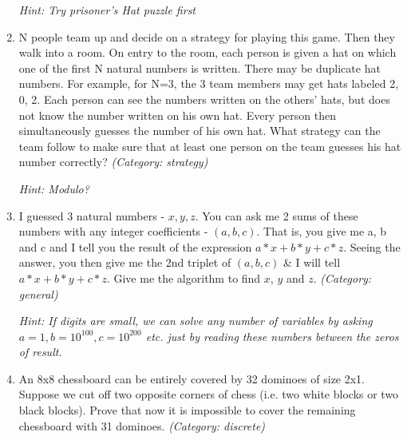 \begin{enumerate}
\small\emph{Hint: Try prisoner's Hat puzzle first}





\item N people team up and decide on a strategy for playing this game. Then they walk into a room.  On entry to the room, each person is given a hat on which one of the first N natural numbers is written. There may be duplicate hat numbers. For example, for N=3, the 3 team members may get hats labeled 2, 0, 2.  Each person can see the numbers written on the others' hats, but does not know the number written on his own hat. Every person then simultaneously guesses the number of his own hat.  What strategy can the team follow to make sure that at least one person on the team guesses his hat number correctly?
\small\emph{(Category: strategy)}

\small\emph{Hint: Modulo?}





\item I guessed 3 natural numbers - $x, y, z$. You can ask me 2 sums of these numbers with any integer coefficients - $(a, b, c)$. That is, you give me a, b and c and I tell you the result of the expression $a*x+b*y+c*z$. Seeing the answer, you then give me the 2nd triplet of $(a,b,c)$ \& I will tell $a*x+b*y+c*z$. Give me the algorithm to find $x$, $y$ and $z$.
\small\emph{(Category: general)}

\small\emph{Hint: If digits are small, we can solve any number of variables by asking $a=1, b=10^{100}, c=10^{200}$ etc. just by reading these numbers between the zeros of result.}





\item An 8x8 chessboard can be entirely covered by 32 dominoes of size 2x1. Suppose we cut off two opposite corners of chess (i.e. two white blocks or two black blocks). Prove that now it is impossible to cover the remaining chessboard with 31 dominoes.
\small\emph{(Category: discrete)}


\end{enumerate}
